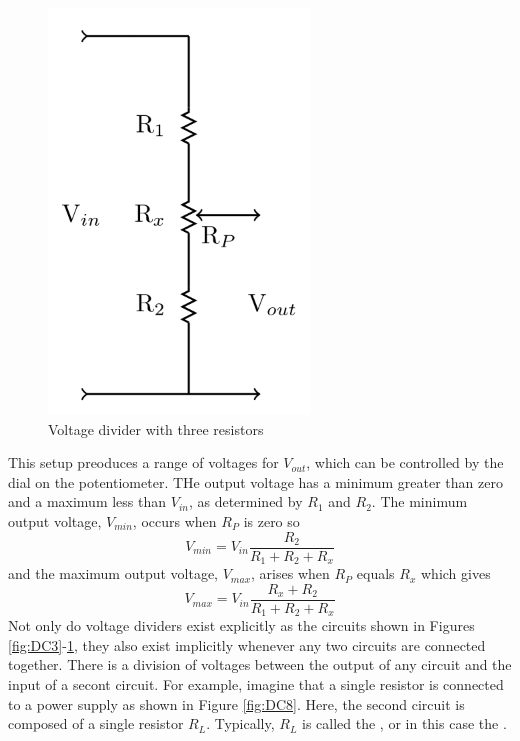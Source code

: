 \begin{figure}[H]
    \centering
    \includegraphics[scale = 0.8]{Images/DC7.PNG}
    \caption{Voltage divider with three resistors}
    \label{fig:DC7}
\end{figure}


This setup preoduces a range of voltages for $V_{out}$, which can be controlled by the dial on the potentiometer. THe output voltage has a minimum greater than zero and a maximum less than $V_{in}$, as determined by $R_1$ and $R_2$. The minimum output voltage, $V_{min}$, occurs when $R_P$ is zero so \begin{equation}\label{eq:DC7}
    V_{min} = V_{in}\frac{R_2}{R_1+R_2+R_x}
\end{equation}
and the maximum output voltage, $V_{max}$, arises when $R_P$ equals $R_x$ which gives \begin{equation}\label{eq:DC8}
    V_{max} = V_{in}\frac{R_x+R_2}{R_1+R_2+R_x}
\end{equation}
Not only do voltage dividers exist explicitly as the circuits shown in Figures \ref{fig:DC3}-\ref{fig:DC7}, they also exist implicitly whenever any two circuits are connected together. There is a division of voltages between the output of any circuit and the input of a secont circuit. For example, imagine that a single resistor is connected to a power supply as shown in Figure \ref{fig:DC8}. Here, the second circuit is composed of a single resistor $R_L$. Typically, $R_L$ is called the , or in this case the .

